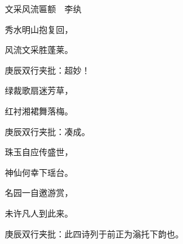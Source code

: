 \begin{poem}
    \begin{pl}文采风流匾额　李纨\end{pl}

    \begin{pl}秀水明山抱复回，\end{pl}

    \begin{pl}风流文采胜蓬莱。    \end{pl}      \begin{note}庚辰双行夹批：超妙！\end{note}

    \begin{pl}绿裁歌扇迷芳草，\end{pl}

    \begin{pl}红衬湘裙舞落梅。    \end{pl}      \begin{note}庚辰双行夹批：凑成。\end{note}

    \begin{pl}珠玉自应传盛世，\end{pl}

    \begin{pl}神仙何幸下瑶台。\end{pl}

    \begin{pl}名园一自邀游赏，\end{pl}

    \begin{pl}未许凡人到此来。    \end{pl}      \begin{note}庚辰双行夹批：此四诗列于前正为滃托下韵也。\end{note}

\end{poem}


